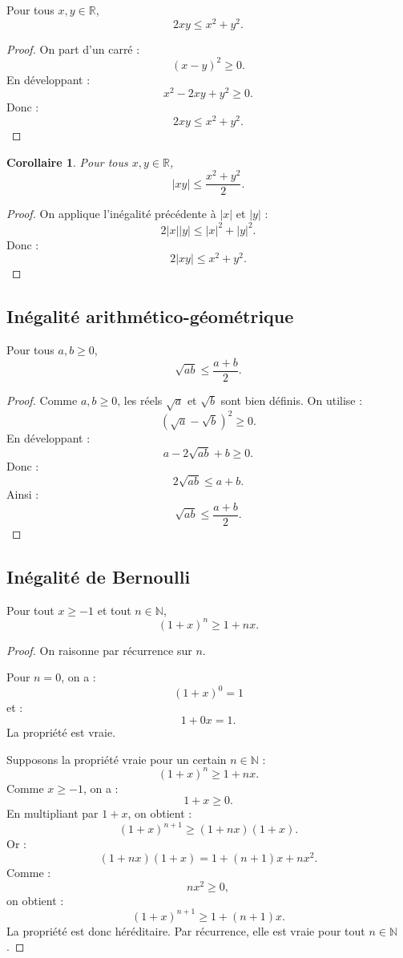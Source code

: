 \documentclass[11pt,a4paper]{article}
\newcommand{\N}{\mathbb N}
\newcommand{\R}{\mathbb R}
\newcommand{\abs}[1]{\left|#1\right|}
\newtheorem{corollaire}[prop]{Corollaire}
\begin{document}
\begin{theorembox}
Pour tous \(x,y\in\R\),
\[
2xy\leq x^2+y^2.
\]
\end{theorembox}

\begin{proof}
On part d'un carré :
\[
(x-y)^2\geq0.
\]
En développant :
\[
x^2-2xy+y^2\geq0.
\]
Donc :
\[
2xy\leq x^2+y^2.
\]
\end{proof}

\begin{corollaire}
Pour tous \(x,y\in\R\),
\[
\abs{xy}\leq \frac{x^2+y^2}{2}.
\]
\end{corollaire}

\begin{proof}
On applique l'inégalité précédente à \(\abs{x}\) et \(\abs{y}\) :
\[
2\abs{x}\abs{y}\leq \abs{x}^2+\abs{y}^2.
\]
Donc :
\[
2\abs{xy}\leq x^2+y^2.
\]
\end{proof}

\subsection{Inégalité arithmético-géométrique}

\begin{theorembox}
Pour tous \(a,b\geq0\),
\[
\sqrt{ab}\leq \frac{a+b}{2}.
\]
\end{theorembox}

\begin{proof}
Comme \(a,b\geq0\), les réels \(\sqrt a\) et \(\sqrt b\) sont bien définis.  
On utilise :
\[
(\sqrt a-\sqrt b)^2\geq0.
\]
En développant :
\[
a-2\sqrt{ab}+b\geq0.
\]
Donc :
\[
2\sqrt{ab}\leq a+b.
\]
Ainsi :
\[
\sqrt{ab}\leq \frac{a+b}{2}.
\]
\end{proof}

\subsection{Inégalité de Bernoulli}

\begin{theorembox}
Pour tout \(x\geq -1\) et tout \(n\in\N\),
\[
(1+x)^n\geq 1+nx.
\]
\end{theorembox}

\begin{proof}
On raisonne par récurrence sur \(n\).

Pour \(n=0\), on a :
\[
(1+x)^0=1
\]
et :
\[
1+0x=1.
\]
La propriété est vraie.

Supposons la propriété vraie pour un certain \(n\in\N\) :
\[
(1+x)^n\geq1+nx.
\]
Comme \(x\geq-1\), on a :
\[
1+x\geq0.
\]
En multipliant par \(1+x\), on obtient :
\[
(1+x)^{n+1}\geq (1+nx)(1+x).
\]
Or :
\[
(1+nx)(1+x)=1+(n+1)x+nx^2.
\]
Comme :
\[
nx^2\geq0,
\]
on obtient :
\[
(1+x)^{n+1}\geq1+(n+1)x.
\]
La propriété est donc héréditaire.  
Par récurrence, elle est vraie pour tout \(n\in\N\).
\end{proof}
\end{document}
